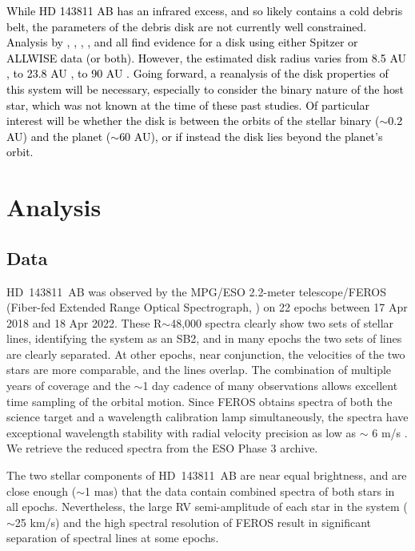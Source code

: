 \documentclass[]{aastex701} %
\begin{document}
\textcolor{black}{While HD 143811 AB has an infrared excess, and so likely contains a cold debris belt, the parameters of the debris disk are not currently well constrained. Analysis by \citet{chen:2011}, \citet{mcdonald:2012}, \citet{ballering:2013}, \citet{chen:2014}, and \citet{cotten:2016} all find evidence for a disk using either Spitzer or ALLWISE data (or both). However, the estimated disk radius varies from 8.5 AU \citep{cotten:2016}, to 23.8 AU \citep{chen:2014}, to 90 AU \citep{chen:2011}. Going forward, a reanalysis of the disk properties of this system will be necessary, especially to consider the binary nature of the host star, which was not known at the time of these past studies. Of particular interest will be whether the disk is between the orbits of the stellar binary ($\sim$0.2 AU) and the planet ($\sim$60 AU), or if instead the disk lies beyond the planet's orbit.}






\section{Analysis}
\subsection{Data}
HD~143811~AB was observed by the MPG/ESO 2.2-meter telescope/FEROS (Fiber-fed Extended Range Optical Spectrograph, \citealt{kaufner:1999}) on 22 epochs between 17 Apr 2018 and 18 Apr 2022.  These R$ \sim$48,000 spectra clearly show two sets of stellar lines, identifying the system as an SB2, and in many epochs the two sets of lines are clearly separated. At other epochs, near conjunction, the velocities of the two stars are more comparable, and the lines overlap.  The combination of multiple years of coverage and the $\sim$1 day cadence of many observations allows excellent time sampling of the orbital motion. Since FEROS obtains spectra of both the science target and a wavelength calibration lamp simultaneously, the spectra have exceptional wavelength stability with radial velocity precision as low as $\sim$ 6 m/s \citep{zakhozhay:2022}. We retrieve the reduced spectra from the ESO Phase 3 archive.



The two stellar components of HD~143811~AB are near equal brightness, and are close enough ($\sim$1 mas) that the data contain combined spectra of both stars in all epochs. Nevertheless, the large RV semi-amplitude of each star in the system ($\sim$25 km/s) and the high spectral resolution of FEROS result in significant separation of spectral lines at some epochs.
\end{document}
